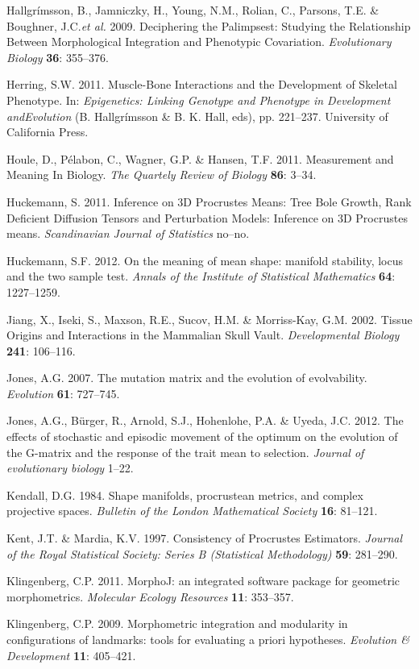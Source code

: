 \documentclass[12pt,]{article}
\begin{document}
Hallgrímsson, B., Jamniczky, H., Young, N.M., Rolian, C., Parsons, T.E.
\& Boughner, J.C.\emph{et al.} 2009. Deciphering the Palimpsest:
Studying the Relationship Between Morphological Integration and
Phenotypic Covariation. \emph{Evolutionary Biology} \textbf{36}:
355--376.

Herring, S.W. 2011. Muscle-Bone Interactions and the Development of
Skeletal Phenotype. In: \emph{Epigenetics: Linking Genotype and
Phenotype in Development andEvolution} (B. Hallgrímsson \& B. K. Hall,
eds), pp. 221--237. University of California Press.

Houle, D., Pélabon, C., Wagner, G.P. \& Hansen, T.F. 2011. Measurement
and Meaning In Biology. \emph{The Quartely Review of Biology}
\textbf{86}: 3--34.

Huckemann, S. 2011. Inference on 3D Procrustes Means: Tree Bole Growth,
Rank Deficient Diffusion Tensors and Perturbation Models: Inference on
3D Procrustes means. \emph{Scandinavian Journal of Statistics} no--no.

Huckemann, S.F. 2012. On the meaning of mean shape: manifold stability,
locus and the two sample test. \emph{Annals of the Institute of
Statistical Mathematics} \textbf{64}: 1227--1259.

Jiang, X., Iseki, S., Maxson, R.E., Sucov, H.M. \& Morriss-Kay, G.M.
2002. Tissue Origins and Interactions in the Mammalian Skull Vault.
\emph{Developmental Biology} \textbf{241}: 106--116.

Jones, A.G. 2007. The mutation matrix and the evolution of evolvability.
\emph{Evolution} \textbf{61}: 727--745.

Jones, A.G., Bürger, R., Arnold, S.J., Hohenlohe, P.A. \& Uyeda, J.C.
2012. The effects of stochastic and episodic movement of the optimum on
the evolution of the G-matrix and the response of the trait mean to
selection. \emph{Journal of evolutionary biology} 1--22.

Kendall, D.G. 1984. Shape manifolds, procrustean metrics, and complex
projective spaces. \emph{Bulletin of the London Mathematical Society}
\textbf{16}: 81--121.

Kent, J.T. \& Mardia, K.V. 1997. Consistency of Procrustes Estimators.
\emph{Journal of the Royal Statistical Society: Series B (Statistical
Methodology)} \textbf{59}: 281--290.

Klingenberg, C.P. 2011. MorphoJ: an integrated software package for
geometric morphometrics. \emph{Molecular Ecology Resources} \textbf{11}:
353--357.

Klingenberg, C.P. 2009. Morphometric integration and modularity in
configurations of landmarks: tools for evaluating a priori hypotheses.
\emph{Evolution \& Development} \textbf{11}: 405--421.
\end{document}
